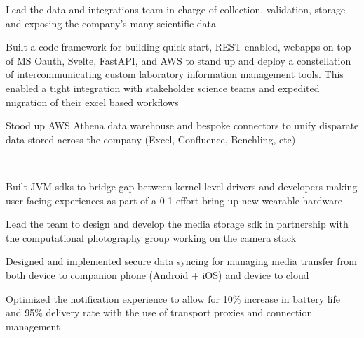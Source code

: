 \documentclass[a4paper]{deedy-resume-openfont} %
\begin{document}
\begin{minipage}[t]{0.66\textwidth}
\begin{tightitemize}
    \item Lead the data and integrations team in charge of collection, validation, storage and exposing the company's many scientific data
    \item Built a code framework for building quick start, REST enabled, webapps on top of MS Oauth, Svelte, FastAPI, and AWS 
    to stand up and deploy a constellation of intercommunicating custom laboratory information management tools. This enabled a tight integration with stakeholder science teams and expedited migration of their excel based workflows
    \item Stood up AWS Athena data warehouse and bespoke connectors to unify disparate data stored across the company (Excel, Confluence, Benchling, etc) 
\end{tightitemize}
\vspace{\topsep}

\\

\begin{tightitemize}
\item Built JVM sdks to bridge gap between kernel level drivers and developers making user facing experiences as part of a 0-1 effort bring up new wearable hardware
\item Lead the team to design and develop the media storage sdk in partnership with the computational photography group working on the camera stack
\item Designed and implemented secure data syncing for managing media transfer from both device to companion phone (Android + iOS) and device to cloud
\item Optimized the notification experience to allow for 10\% increase in battery life and 95\% delivery  rate with the use of transport proxies and connection management
\end{tightitemize}



\end{minipage}
\end{document}
